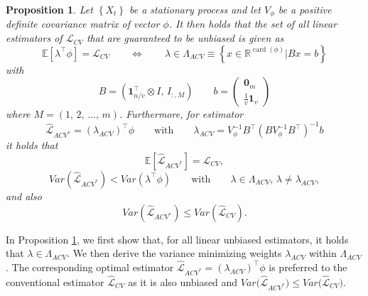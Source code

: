 \documentclass[11pt,dvipsnames]{article}
\newtheorem{proposition}{Proposition}
\DeclareMathOperator{\cardt}{card}
\begin{document}
\begin{proposition} \label{prop:PropositionMain}
Let $ \left\lbrace X_{t} \right\rbrace $ be a stationary process and let $ V_{\phi} $ be a positive definite covariance matrix of vector $ \phi $. It then holds that the set of all linear estimators of $ \mathcal{L}_{CV} $ that are guaranteed to be unbiased is given as
\begin{equation}
\mathbb{E}[\lambda^{\top}\phi]=\mathcal{L}_{CV}  \qquad \iff \qquad \lambda \in \Lambda_{ACV} \equiv \left\lbrace x \in \mathbb{R}^{\cardt(\phi)} \Bigg| Bx=b \right\rbrace
\end{equation}
with
\begin{equation}
B=\left(  \mathbf{1}_{n/v}^{\top}\otimes I,\,I_{:,M} \right) \qquad b=
\begin{pmatrix}
\mathbf{0}_{m}\\
\frac{1}{v}\mathbf{1}_{v}
\end{pmatrix}
\end{equation}
where $ M=\left(1,\,2,\,\ldots,\,m \right)  $. Furthermore, for estimator
\begin{equation}\label{eq:LACV} 
\widehat{\mathcal{L}}_{ACV^{*}}=\left( \lambda_{ACV}\right)^{\top}\phi \qquad \text{with} \qquad \lambda_{ACV}= V_{\phi}^{-1}B^{\top}\left( B V_{\phi}^{-1} B^{\top} \right)^{-1} b
\end{equation}
it holds that
\begin{equation}
\mathbb{E}\left[\widehat{\mathcal{L}}_{ACV^{*}}\right]=\mathcal{L}_{CV}, 
\end{equation}
\begin{equation}
Var\left(\widehat{\mathcal{L}}_{ACV^{*}}\right) < Var\left(\lambda^{\top}\phi\right) \qquad \text{with} \qquad \lambda \in \Lambda_{ACV},\, \lambda \neq \lambda_{ACV},
\end{equation}
and also
\begin{equation}
Var\left(\widehat{\mathcal{L}}_{ACV^{*}}\right) \leq Var\left(\widehat{\mathcal{L}}_{CV}\right).
\end{equation}
\end{proposition}

In Proposition \ref{prop:PropositionMain}, we first show that, for all linear unbiased estimators, it holds that $ \lambda \in \Lambda_{ACV} $. We then derive the variance minimizing weights $ \lambda_{ACV} $ within $  \Lambda_{ACV} $. The corresponding optimal estimator $ \widehat{\mathcal{L}}_{ACV^{*}}= (\lambda_{ACV})^{\top} \phi $ is preferred to the conventional estimator $ \widehat{\mathcal{L}}_{CV} $ as it is also unbiased and $ Var\big(\widehat{\mathcal{L}}_{ACV^{*}}\big) \leq Var\big(\widehat{\mathcal{L}}_{CV}\big) $.
\end{document}
